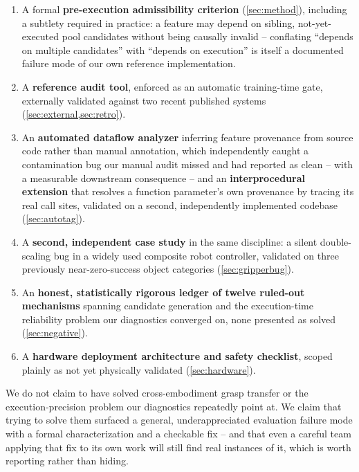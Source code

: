 \documentclass[journal]{IEEEtran}
\begin{document}
\begin{enumerate}
\item A formal \textbf{pre-execution admissibility criterion}
  (\cref{sec:method}), including a subtlety required in practice: a
  feature may depend on sibling, not-yet-executed pool candidates without
  being causally invalid -- conflating ``depends on multiple candidates''
  with ``depends on execution'' is itself a documented failure mode of our
  own reference implementation.
\item A \textbf{reference audit tool}, enforced as an automatic
  training-time gate, externally validated against two recent published
  systems (\cref{sec:external,sec:retro}).
\item An \textbf{automated dataflow analyzer} inferring feature provenance
  from source code rather than manual annotation, which independently
  caught a contamination bug our manual audit missed and had reported as
  clean -- with a measurable downstream consequence -- and an
  \textbf{interprocedural extension} that resolves a function parameter's
  own provenance by tracing its real call sites, validated on a second,
  independently implemented codebase (\cref{sec:autotag}).
\item A \textbf{second, independent case study} in the same discipline: a
  silent double-scaling bug in a widely used composite robot controller,
  validated on three previously near-zero-success object categories
  (\cref{sec:gripperbug}).
\item An \textbf{honest, statistically rigorous ledger of twelve
  ruled-out mechanisms} spanning candidate generation and the
  execution-time reliability problem our diagnostics converged on, none
  presented as solved (\cref{sec:negative}).
\item A \textbf{hardware deployment architecture and safety checklist},
  scoped plainly as not yet physically validated (\cref{sec:hardware}).
\end{enumerate}

We do not claim to have solved cross-embodiment grasp transfer or the
execution-precision problem our diagnostics repeatedly point at. We claim
that trying to solve them surfaced a general, underappreciated evaluation
failure mode with a formal characterization and a checkable fix -- and
that even a careful team applying that fix to its own work will still
find real instances of it, which is worth reporting rather than hiding.

\end{document}
